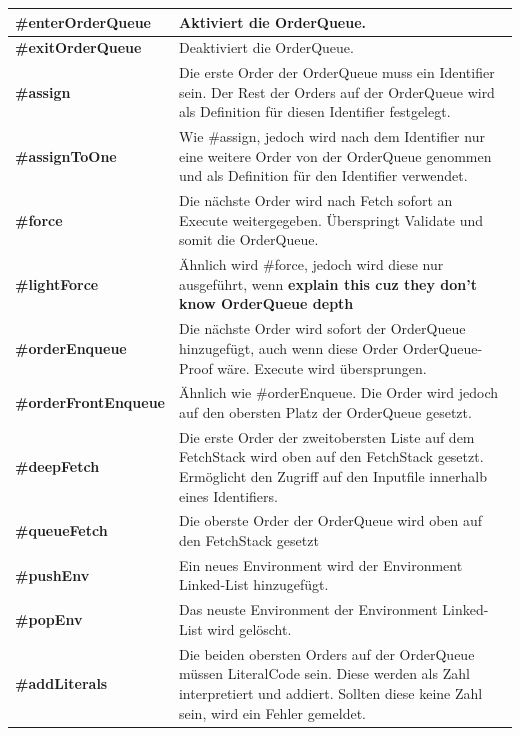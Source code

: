 \begin{table}[H]
    \begin{tabularx}{\textwidth}{l|X}
    \textbf{\#enterOrderQueue}      & Aktiviert die OrderQueue. \\ \hline
    \textbf{\#exitOrderQueue}       & Deaktiviert die OrderQueue. \\ \hline
    \textbf{\#assign}               & Die erste Order der OrderQueue muss ein Identifier sein. Der Rest der Orders auf der OrderQueue wird als Definition für diesen Identifier festgelegt. \\ \hline
    \textbf{\#assignToOne}          & Wie \#assign, jedoch wird nach dem Identifier nur eine weitere Order von der OrderQueue genommen und als Definition für den Identifier verwendet. \\ \hline
    \textbf{\#force}                & Die nächste Order wird nach Fetch sofort an Execute weitergegeben. Überspringt Validate und somit die OrderQueue. \\ \hline
    \textbf{\#lightForce}           & Ähnlich wird \#force, jedoch wird diese nur ausgeführt, wenn \textbf{explain this cuz they don't know OrderQueue depth} \\ \hline
    \textbf{\#orderEnqueue}         & Die nächste Order wird sofort der OrderQueue hinzugefügt, auch wenn diese Order OrderQueue-Proof wäre. Execute wird übersprungen. \\ \hline
    \textbf{\#orderFrontEnqueue}    & Ähnlich wie \#orderEnqueue. Die Order wird jedoch auf den obersten Platz der OrderQueue gesetzt. \\ \hline
    \textbf{\#deepFetch}            & Die erste Order der zweitobersten Liste auf dem FetchStack wird oben auf den FetchStack gesetzt. Ermöglicht den Zugriff auf den Inputfile innerhalb eines Identifiers. \\ \hline
    \textbf{\#queueFetch}           & Die oberste Order der OrderQueue wird oben auf den FetchStack gesetzt \\ \hline 
    \textbf{\#pushEnv}              & Ein neues Environment wird der Environment Linked-List hinzugefügt. \\ \hline
    \textbf{\#popEnv}               & Das neuste Environment der Environment Linked-List wird gelöscht. \\ \hline
    \textbf{\#addLiterals}          & Die beiden obersten Orders auf der OrderQueue müssen LiteralCode sein. Diese werden als Zahl interpretiert und addiert. Sollten diese keine Zahl sein, wird ein Fehler gemeldet.        
    \end{tabularx}
\end{table}

